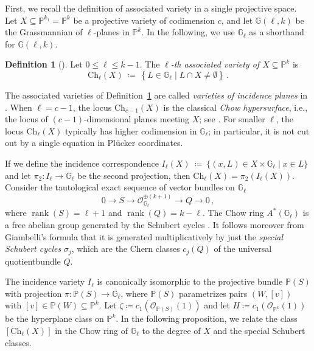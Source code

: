 \documentclass[12pt]{article}
\theoremstyle{definition}
\newtheorem{definition}[theorem]{Definition}
\newcommand{\G}{{\mathbb G}}
\newcommand{\PP}{{\mathbb P}}
\def\rank{\operatorname{rank}}
\newcommand{\ko}{{\mathcal O}}
\begin{document}
\medskip

First, we recall the definition of associated variety in a single projective space. Let $X\subseteq\PP^{k_1}=\PP^k$ be a projective variety of codimension $c$, and let $\G(\ell,k)$ be the Grassmannian of $\ell$-planes in $\PP^k$. In the following, we use $\G_\ell$ as a shorthand for $\G(\ell,k)$.

\begin{definition}[{\cite[Definition 4.10]{kohn2018isotropic}}]\label{def: associated variety}
Let $0\le \ell \le k-1$. The {\em $\ell$-th associated variety of $X\subseteq\PP^k$} is
\[
    \mathrm{Ch}_\ell(X)\ \coloneqq\ \left\{L\in \G_\ell\mid L\cap X\neq \emptyset\right\}\,.
\]
\end{definition}
The associated varieties of Definition~\ref{def: associated variety} are called {\em varieties of incidence planes} in \cite[Examples 6.14, 11.18, 16.6]{harris1992algebraic}.
When $\ell=c-1$, the locus $\mathrm{Ch}_{c-1}(X)$ is the classical \emph{Chow hypersurface}, i.e., the locus of $(c-1)$-dimensional planes meeting $X$; see \cite{waerdenvander1937geometrie}.
For smaller $\ell$, the locus $\mathrm{Ch}_\ell(X)$ typically has higher codimension in $\G_\ell$; in particular, it is not cut out by a single equation in Pl\"ucker coordinates.

\medskip

If we define the incidence correspondence $I_\ell(X) \ \coloneqq\ \{(x,L)\in X\times \G_\ell \mid x\in L\}$ and let $\pi_2\colon I_\ell\to \G_\ell$ be the second projection, then $\mathrm{Ch}_\ell(X) = \pi_2(I_\ell(X))$. Consider the tautological exact sequence of vector bundles on $\G_\ell$
\begin{equation}\label{eq: tautological sequence}
    0\to S \longrightarrow \ko_{\G_\ell}^{\oplus (k+1)} \longrightarrow Q \to 0\,,
\end{equation}
where $\rank(S)=\ell+1$ and $\rank(Q)=k-\ell$.
The Chow ring $A^*(\G_\ell)$ is a free abelian group generated by the Schubert cycles \cite[Corollary 4.7]{EH}. It follows moreover from Giambelli's formula \cite[Proposition 4.16]{EH} that it is generated multiplicatively by just the {\em special Schubert cycles} $\sigma_j$, which are the Chern classes $c_j(Q)$ of the universal quotientbundle $Q$.

The incidence variety $I_\ell$ is canonically isomorphic to the projective bundle $\PP(S)$ with projection $\pi\colon \PP(S)\to\G_\ell$, where $\PP(S)$ parametrizes pairs $(W,[v])$ with $[v]\in \PP(W)\subseteq \PP^k$. Let $\zeta\coloneqq c_1(\ko_{\PP(S)}(1))$ and let $H\coloneqq c_1(\ko_{\PP^k}(1))$ be the hyperplane class on $\PP^k$.
In the following proposition, we relate the class $[\mathrm{Ch}_\ell(X)]$ in the Chow ring of $\G_\ell$ to the degree of $X$ and the special Schubert classes.
\end{document}
